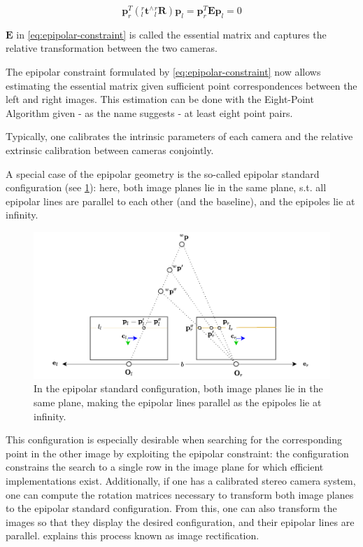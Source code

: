 \documentclass[headsepline, hidelinks, footsepline, footinclude=false, oneside, fontsize=11pt, paper=a4, listof=totoc, bibliography=totoc]{scrbook}
\begin{document}
\begin{equation}
\label{eq:epipolar-constraint}
\mathbf{p}_r^T ({}^r_l\mathbf{t}^\wedge {}^r_l\mathbf{R})\mathbf{p}_l = \mathbf{p}_r^T \mathbf{E} \mathbf{p}_l = 0
\end{equation}

\(\mathbf{E}\) in \cref{eq:epipolar-constraint} is called the essential matrix and captures the relative transformation between the two cameras.

The epipolar constraint formulated by \cref{eq:epipolar-constraint} now allows estimating the essential matrix given sufficient point correspondences between the left and right images. 
This estimation can be done with the Eight-Point Algorithm \cite{longuet-higginsComputerAlgorithmReconstructing1981,hartleyDefenseEightpointAlgorithm1997} given - as the name suggests - at least eight point pairs.

Typically, one calibrates the intrinsic parameters of each camera and the relative extrinsic calibration between cameras conjointly. 

A special case of the epipolar geometry is the so-called epipolar standard configuration (see \cref{fig:epipolar-standard}): 
here, both image planes lie in the same plane, s.t. all epipolar lines are parallel to each other (and the baseline), and the epipoles lie at infinity. 

\begin{figure}[htbp]
\centering
\includegraphics[width=.9\linewidth]{figures/epipolar-standard.pdf}
\caption{\label{fig:epipolar-standard}In the epipolar standard configuration, both image planes lie in the same plane, making the epipolar lines parallel as the epipoles lie at infinity.}
\end{figure}

This configuration is especially desirable when searching for the corresponding point in the other image by exploiting the epipolar constraint:
the configuration constrains the search to a single row in the image plane for which efficient implementations exist. 
Additionally, if one has a calibrated stereo camera system, one can compute the rotation matrices necessary to transform both image planes to the epipolar standard configuration. From this, one can also transform the images so that they display the desired configuration, and their epipolar lines are parallel. 
\cite{hartleyMultipleViewGeometry2004} explains this process known as image rectification.
\end{document}
